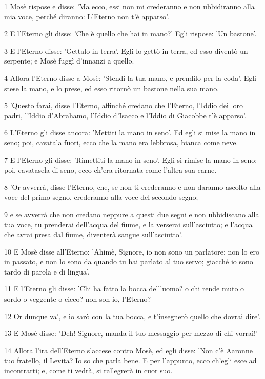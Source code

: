 \par 1 Mosè rispose e disse: 'Ma ecco, essi non mi crederanno e non ubbidiranno alla mia voce, perché diranno: L'Eterno non t'è apparso'.
\par 2 E l'Eterno gli disse: 'Che è quello che hai in mano?' Egli rispose: 'Un bastone'.
\par 3 E l'Eterno disse: 'Gettalo in terra'. Egli lo gettò in terra, ed esso diventò un serpente; e Mosè fuggì d'innanzi a quello.
\par 4 Allora l'Eterno disse a Mosè: 'Stendi la tua mano, e prendilo per la coda'. Egli stese la mano, e lo prese, ed esso ritornò un bastone nella sua mano.
\par 5 'Questo farai, disse l'Eterno, affinché credano che l'Eterno, l'Iddio dei loro padri, l'Iddio d'Abrahamo, l'Iddio d'Isacco e l'Iddio di Giacobbe t'è apparso'.
\par 6 L'Eterno gli disse ancora: 'Mettiti la mano in seno'. Ed egli si mise la mano in seno; poi, cavatala fuori, ecco che la mano era lebbrosa, bianca come neve.
\par 7 E l'Eterno gli disse: 'Rimettiti la mano in seno'. Egli si rimise la mano in seno; poi, cavatasela di seno, ecco ch'era ritornata come l'altra sua carne.
\par 8 'Or avverrà, disse l'Eterno, che, se non ti crederanno e non daranno ascolto alla voce del primo segno, crederanno alla voce del secondo segno;
\par 9 e se avverrà che non credano neppure a questi due segni e non ubbidiscano alla tua voce, tu prenderai dell'acqua del fiume, e la verserai sull'asciutto; e l'acqua che avrai presa dal fiume, diventerà sangue sull'asciutto'.
\par 10 E Mosè disse all'Eterno: 'Ahimè, Signore, io non sono un parlatore; non lo ero in passato, e non lo sono da quando tu hai parlato al tuo servo; giacché io sono tardo di parola e di lingua'.
\par 11 E l'Eterno gli disse: 'Chi ha fatto la bocca dell'uomo? o chi rende muto o sordo o veggente o cieco? non son io, l'Eterno?
\par 12 Or dunque va', e io sarò con la tua bocca, e t'insegnerò quello che dovrai dire'.
\par 13 E Mosè disse: 'Deh! Signore, manda il tuo messaggio per mezzo di chi vorrai!'
\par 14 Allora l'ira dell'Eterno s'accese contro Mosè, ed egli disse: 'Non c'è Aaronne tuo fratello, il Levita? Io so che parla bene. E per l'appunto, ecco ch'egli esce ad incontrarti; e, come ti vedrà, si rallegrerà in cuor suo.
